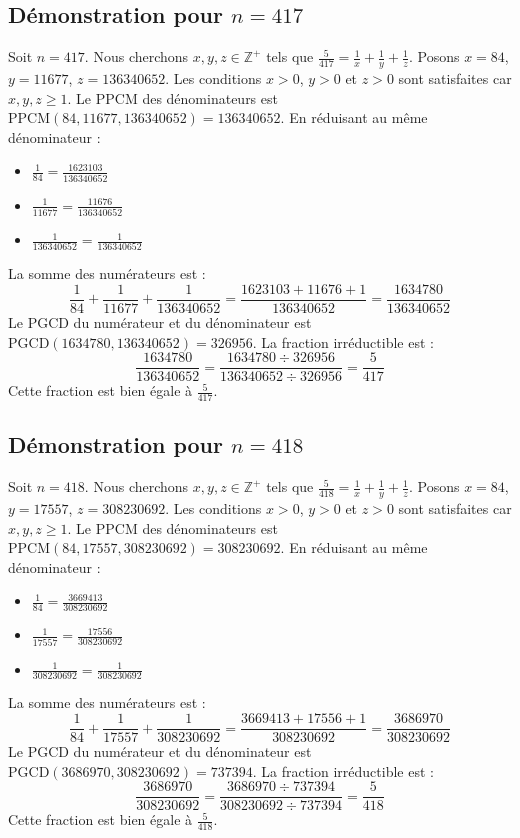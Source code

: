 \documentclass[11pt,a4paper]{article}
\begin{document}
\subsection{Démonstration pour $n = 417$}
Soit $n = 417$. Nous cherchons $x, y, z \in \mathbb{Z}^{+}$ tels que $\frac{5}{417} = \frac{1}{x} + \frac{1}{y} + \frac{1}{z}$.
Posons $x = 84$, $y = 11677$, $z = 136340652$.
Les conditions $x > 0$, $y > 0$ et $z > 0$ sont satisfaites car $x, y, z \geq 1$.
Le PPCM des dénominateurs est $\text{PPCM}(84, 11677, 136340652) = 136340652$.
En réduisant au même dénominateur :
\begin{itemize}
    \item $\frac{1}{84} = \frac{1623103}{136340652}$
    \item $\frac{1}{11677} = \frac{11676}{136340652}$
    \item $\frac{1}{136340652} = \frac{1}{136340652}$
\end{itemize}
La somme des numérateurs est :
$$ \frac{1}{84} + \frac{1}{11677} + \frac{1}{136340652} = \frac{1623103 + 11676 + 1}{136340652} = \frac{1634780}{136340652} $$
Le PGCD du numérateur et du dénominateur est $\text{PGCD}(1634780, 136340652) = 326956$.
La fraction irréductible est :
$$ \frac{1634780}{136340652} = \frac{1634780 \div 326956}{136340652 \div 326956} = \frac{5}{417} $$
Cette fraction est bien égale à $\frac{5}{417}$.

\subsection{Démonstration pour $n = 418$}
Soit $n = 418$. Nous cherchons $x, y, z \in \mathbb{Z}^{+}$ tels que $\frac{5}{418} = \frac{1}{x} + \frac{1}{y} + \frac{1}{z}$.
Posons $x = 84$, $y = 17557$, $z = 308230692$.
Les conditions $x > 0$, $y > 0$ et $z > 0$ sont satisfaites car $x, y, z \geq 1$.
Le PPCM des dénominateurs est $\text{PPCM}(84, 17557, 308230692) = 308230692$.
En réduisant au même dénominateur :
\begin{itemize}
    \item $\frac{1}{84} = \frac{3669413}{308230692}$
    \item $\frac{1}{17557} = \frac{17556}{308230692}$
    \item $\frac{1}{308230692} = \frac{1}{308230692}$
\end{itemize}
La somme des numérateurs est :
$$ \frac{1}{84} + \frac{1}{17557} + \frac{1}{308230692} = \frac{3669413 + 17556 + 1}{308230692} = \frac{3686970}{308230692} $$
Le PGCD du numérateur et du dénominateur est $\text{PGCD}(3686970, 308230692) = 737394$.
La fraction irréductible est :
$$ \frac{3686970}{308230692} = \frac{3686970 \div 737394}{308230692 \div 737394} = \frac{5}{418} $$
Cette fraction est bien égale à $\frac{5}{418}$.
\end{document}
